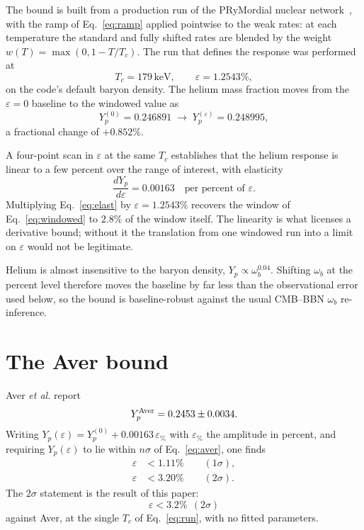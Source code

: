\documentclass[aps,prd,twocolumn,superscriptaddress,nofootinbib,10pt]{revtex4-2}
\begin{document}
The bound is built from a production run of the PRyMordial nuclear
network~\cite{PRyMordial2023}, with the ramp of Eq.~\eqref{eq:ramp} applied pointwise to the weak
rates: at each temperature the standard and fully shifted rates are blended by the weight
$w(T)=\max(0,1-T/T_c)$. The run that defines the response was performed at
%
\begin{equation}
  T_c = 179\,\mathrm{keV},\qquad \varepsilon = 1.2543\%,
  \label{eq:run}
\end{equation}
%
on the code's default baryon density. The helium mass fraction moves from the $\varepsilon=0$
baseline to the windowed value as
%
\begin{equation}
  Y_p^{(0)} = 0.246891
  \;\longrightarrow\;
  Y_p^{(\varepsilon)} = 0.248995,
  \label{eq:windowed}
\end{equation}
%
a fractional change of $+0.852\%$.

A four-point scan in $\varepsilon$ at the same $T_c$ establishes that the helium response is
linear to a few percent over the range of interest, with elasticity
%
\begin{equation}
  \frac{d Y_p}{d\varepsilon}
  = 0.00163
  \quad\text{per percent of $\varepsilon$}.
  \label{eq:elast}
\end{equation}
%
Multiplying Eq.~\eqref{eq:elast} by $\varepsilon=1.2543\%$ recovers the window of
Eq.~\eqref{eq:windowed} to $2.8\%$ of the window itself. The linearity is what licenses a
derivative bound; without it the translation from one windowed run into a limit on $\varepsilon$
would not be legitimate.

Helium is almost insensitive to the baryon density, $Y_p \propto \omega_b^{0.04}$. Shifting
$\omega_b$ at the percent level therefore moves the baseline by far less than the observational
error used below, so the bound is baseline-robust against the usual CMB--BBN $\omega_b$
re-inference.

\section{The Aver bound}\label{sec:bound}

Aver \emph{et al.} report~\cite{Aver2021}
%
\begin{equation}
  Y_p^{\rm Aver} = 0.2453 \pm 0.0034.
  \label{eq:aver}
\end{equation}
%
Writing $Y_p(\varepsilon) = Y_p^{(0)} + 0.00163\,\varepsilon_{\%}$ with $\varepsilon_{\%}$ the
amplitude in percent, and requiring $Y_p(\varepsilon)$ to lie within $n\sigma$ of
Eq.~\eqref{eq:aver}, one finds
%
\begin{align}
  \varepsilon &< 1.11\% \qquad (1\sigma), \label{eq:1sig}\\
  \varepsilon &< 3.20\% \qquad (2\sigma). \label{eq:2sig}
\end{align}
%
The $2\sigma$ statement is the result of this paper:
%
\begin{equation}
  \boxed{\ \varepsilon < 3.2\%\ \ (2\sigma)\ }
  \label{eq:result}
\end{equation}
%
against Aver, at the single $T_c$ of Eq.~\eqref{eq:run}, with no fitted parameters.
\end{document}
